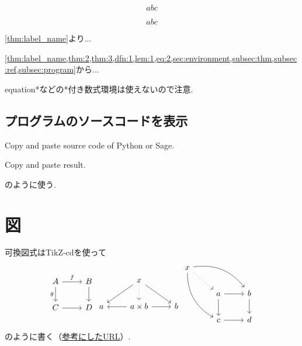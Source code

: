 \documentclass[11pt,a4paper,oneside,lualatex]{ltjsarticle} %
\numberwithin{equation}{section} %
\begin{document}
\begin{equation} \label{eq:1}
	abc
\end{equation}

\begin{equation} \label{eq:2}
	abc
\end{equation}

\cref{thm:label_name}より... 

\cref{thm:label_name,thm:2,thm:3,dfn:1,lem:1,eq:2,sec:environment,subsec:thm,subsec:ref,subsec:program}から...

equation*などの*付き数式環境は使えないので注意.


\subsection{プログラムのソースコードを表示} \label{subsec:program}


\begin{Python}
Copy and paste source code of Python or Sage.
\end{Python}
\begin{result}
Copy and paste result.
\end{result}
のように使う.


\section{図} \label{sec:diag}


可換図式はTikZ-cdを使って
\begin{equation}
	\begin{tikzcd}
		A \ar[r, "f"] \arrow[d, "g"'] & B \ar[d] \\
		C \ar[r] & D
	\end{tikzcd}
	\begin{tikzcd}
		& x \arrow[ld] \arrow[d, dotted] \arrow[rd] & \\
		a & a\times b \arrow[l] \arrow[r] & b
	\end{tikzcd}
	\begin{tikzcd}
		x \arrow[ddr, bend right] \arrow[rrd, bend left] \arrow[rd, dotted] & & \\
		& a \arrow[r] \arrow[d] & b \arrow[d] \\
		& c \arrow[r] & d
	\end{tikzcd}
\end{equation}
のように書く（\href{https://blog.miz-ar.info/2017/06/commutative-diagrams-in-latex/}{参考にしたURL}）.
\end{document}
